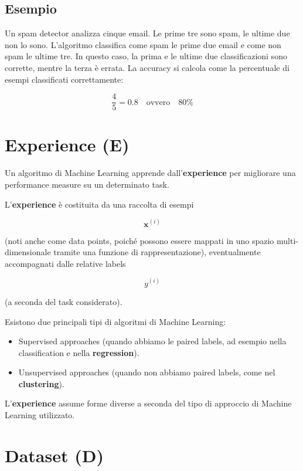 \subsection{Esempio}

Un spam detector analizza cinque email. Le prime tre sono spam, le ultime due non lo sono. L'algoritmo classifica come spam le prime due email e come non spam le ultime tre. In questo caso, la prima e le ultime due classificazioni sono corrette, mentre la terza è errata. La accuracy si calcola come la percentuale di esempi classificati correttamente:

$$
\frac{4}{5} = 0.8 \quad \text{ovvero} \quad 80\%
$$

\section{Experience (E)}

Un algoritmo di Machine Learning apprende dall'\textbf{experience} per migliorare una performance measure su un determinato task.

\noindent
L'\textbf{experience} è costituita da una raccolta di esempi

\[
 \mathbf{x}^{(i)}
\]

\noindent
(noti anche come data points, poiché possono essere mappati in uno spazio multi-dimensionale tramite una funzione di rappresentazione), eventualmente accompagnati dalle relative labels 

\[ y^{(i)} \]

\noindent
(a seconda del task considerato).

\noindent
Esistono due principali tipi di algoritmi di Machine Learning:

\begin{itemize}
\item Supervised approaches (quando abbiamo le paired labels, ad esempio nella classification e nella \textbf{regression}).
\item Unsupervised approaches (quando non abbiamo paired labels, come nel \textbf{clustering}).
\end{itemize}

\noindent
L'\textbf{experience} assume forme diverse a seconda del tipo di approccio di Machine Learning utilizzato.

\section{Dataset (D)}

